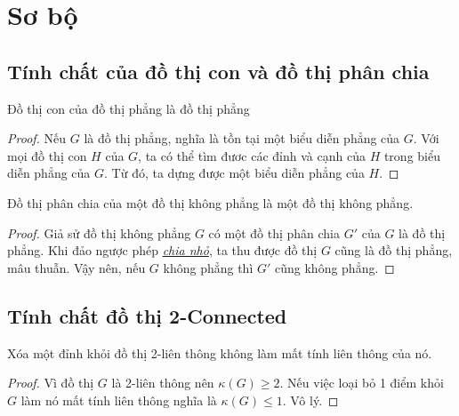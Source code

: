 \section{Sơ bộ}
\subsection{Tính chất của đồ thị con và đồ thị phân chia}

\begin{corollary}
    Đồ thị con của đồ thị phẳng là đồ thị phẳng
\end{corollary}

\begin{proof}
    Nếu $G$ là đồ thị phẳng, nghĩa là tồn tại một biểu diễn phẳng của $G$. Với mọi đồ thị con
    $H$ của $G$, ta có thể tìm đươc các đỉnh và cạnh của $H$ trong biểu diễn phẳng của $G$.
    Từ đó, ta dựng được một biểu diễn phẳng của $H$.
\end{proof}


\begin{corollary}
    Đồ thị phân chia của một đồ thị không phẳng là một đồ thị không phẳng.
\end{corollary}
\begin{proof}
    Giả sử đồ thị không phẳng $G$ có một đồ thị phân chia $G'$ của $G$ là đồ thị phẳng.
    Khi đảo ngược phép \hyperref[def:subdivision]{\textit{chia nhỏ}}, ta thu được đồ thị $G$ cũng là đồ thị phẳng, mâu thuẫn.
    Vậy nên, nếu $G$ không phẳng thì $G'$ cũng không phẳng.
\end{proof}

\subsection{Tính chất đồ thị 2-Connected}
\begin{corollary}
    Xóa một đỉnh khỏi đồ thị 2-liên thông không làm mất tính liên thông của nó.
\end{corollary}
\begin{proof}
    Vì đồ thị $G$ là 2-liên thông nên $\kappa(G) \geq 2$. Nếu việc loại bỏ 1 điểm khỏi $G$ làm nó mất tính liên thông nghĩa là $\kappa(G) \leq 1$. Vô lý.
\end{proof}

